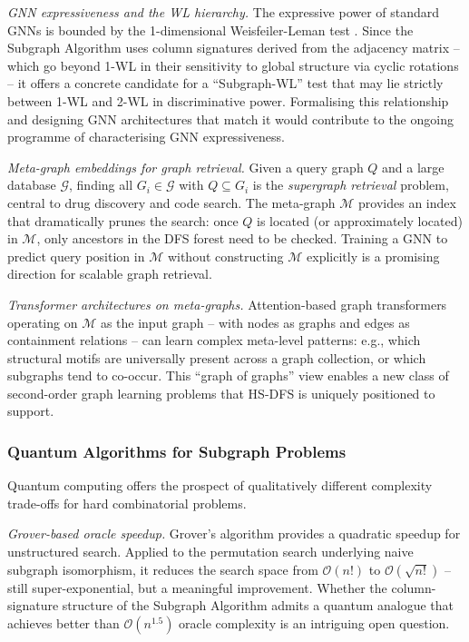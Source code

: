 ﻿\documentclass[12pt,a4paper]{article}
\theoremstyle{plain}
\theoremstyle{definition}
\theoremstyle{remark}
\begin{document}
	\emph{GNN expressiveness and the WL hierarchy.}  The expressive power of
	standard GNNs is bounded by the 1-dimensional Weisfeiler-Leman test
	\cite{weisfeiler1968}.  Since the Subgraph Algorithm uses column signatures
	derived from the adjacency matrix -- which go beyond 1-WL in their
	sensitivity to global structure via cyclic rotations -- it offers a
	concrete candidate for a ``Subgraph-WL'' test that may lie strictly between
	1-WL and 2-WL in discriminative power.  Formalising this relationship and
	designing GNN architectures that match it would contribute to the ongoing
	programme of characterising GNN expressiveness.

	\emph{Meta-graph embeddings for graph retrieval.}  Given a query graph $Q$
	and a large database $\mathcal{G}$, finding all $G_i \in \mathcal{G}$ with
	$Q \subseteq G_i$ is the \emph{supergraph retrieval} problem, central to
	drug discovery and code search.  The meta-graph $\mathcal{M}$ provides an
	index that dramatically prunes the search: once $Q$ is located (or
	approximately located) in $\mathcal{M}$, only ancestors in the DFS forest
	need to be checked.  Training a GNN to predict query position in
	$\mathcal{M}$ without constructing $\mathcal{M}$ explicitly is a promising
	direction for scalable graph retrieval.

	\emph{Transformer architectures on meta-graphs.}  Attention-based graph
	transformers operating on $\mathcal{M}$ as the input graph -- with nodes
	as graphs and edges as containment relations -- can learn complex
	meta-level patterns: e.g., which structural motifs are universally present
	across a graph collection, or which subgraphs tend to co-occur.  This
	``graph of graphs'' view enables a new class of second-order graph learning
	problems that HS-DFS is uniquely positioned to support.

	\subsubsection*{Quantum Algorithms for Subgraph Problems}

	Quantum computing offers the prospect of qualitatively different complexity
	trade-offs for hard combinatorial problems.

	\emph{Grover-based oracle speedup.}  Grover's algorithm provides a
	quadratic speedup for unstructured search.  Applied to the permutation
	search underlying naive subgraph isomorphism, it reduces the search space
	from $\mathcal{O}(n!)$ to $\mathcal{O}(\sqrt{n!})$ -- still
	super-exponential, but a meaningful improvement.  Whether the
	column-signature structure of the Subgraph Algorithm admits a quantum
	analogue that achieves better than $\mathcal{O}(n^{1.5})$ oracle
	complexity is an intriguing open question.
\end{document}
